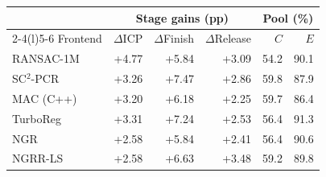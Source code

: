 \small\setlength{\tabcolsep}{3.5pt}
\begin{tabular}{@{}lrrrrr@{}}
\toprule
 & \multicolumn{3}{c}{Stage gains (pp)} & \multicolumn{2}{c}{Pool (\%)} \\
\cmidrule(lr){2-4}\cmidrule(l){5-6}
Frontend & $\Delta$ICP & $\Delta$Finish & $\Delta$Release & $C$ & $E$ \\
\midrule
RANSAC-1M & +4.77 & +5.84 & +3.09 & 54.2 & 90.1 \\
SC$^2$-PCR & +3.26 & +7.47 & +2.86 & 59.8 & 87.9 \\
MAC (C++) & +3.20 & +6.18 & +2.25 & 59.7 & 86.4 \\
TurboReg & +3.31 & +7.24 & +2.53 & 56.4 & 91.3 \\
NGR & +2.58 & +5.84 & +2.41 & 56.4 & 90.6 \\
NGRR-LS & +2.58 & +6.63 & +3.48 & 59.2 & 89.8 \\
\bottomrule
\end{tabular}
